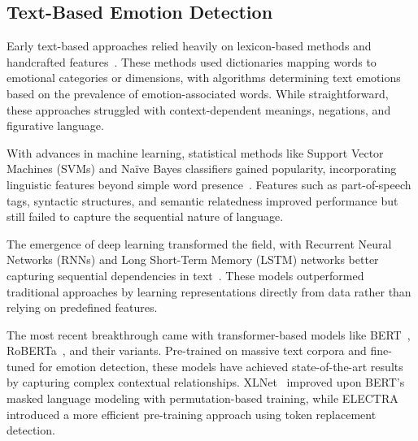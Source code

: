 \documentclass[12pt]{article}
\begin{document}
\subsection{Text-Based Emotion Detection}
Early text-based approaches relied heavily on lexicon-based methods and handcrafted features~\cite{mohammad2013crowdsourcing}. These methods used dictionaries mapping words to emotional categories or dimensions, with algorithms determining text emotions based on the prevalence of emotion-associated words. While straightforward, these approaches struggled with context-dependent meanings, negations, and figurative language.

With advances in machine learning, statistical methods like Support Vector Machines (SVMs) and Naïve Bayes classifiers gained popularity, incorporating linguistic features beyond simple word presence~\cite{wang2012harnessing}. Features such as part-of-speech tags, syntactic structures, and semantic relatedness improved performance but still failed to capture the sequential nature of language.

The emergence of deep learning transformed the field, with Recurrent Neural Networks (RNNs) and Long Short-Term Memory (LSTM) networks better capturing sequential dependencies in text~\cite{abdul2017emonet}. These models outperformed traditional approaches by learning representations directly from data rather than relying on predefined features.

The most recent breakthrough came with transformer-based models like BERT~\cite{devlin2018bert}, RoBERTa~\cite{liu2019roberta}, and their variants. Pre-trained on massive text corpora and fine-tuned for emotion detection, these models have achieved state-of-the-art results by capturing complex contextual relationships. XLNet~\cite{yang2019xlnet} improved upon BERT's masked language modeling with permutation-based training, while ELECTRA~\cite{clark2020electra} introduced a more efficient pre-training approach using token replacement detection.
\end{document}
